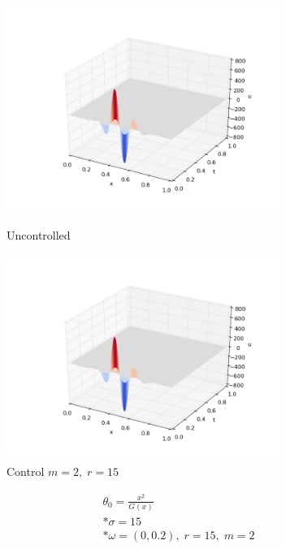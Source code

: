 \documentclass[a4:paper,14pt]{article}
\begin{document}
\begin{figure}[h]
\centering
\begin{minipage}{.5\textwidth}
  \centering
  \includegraphics[width=3.5in]{ex_sin10_s15}
  \caption{Uncontrolled}
  \label{fig:test1}
\end{minipage}%
\begin{minipage}{.5\textwidth}
  \centering
  \includegraphics[width=3.5in]{re_sin10_s15}
  \caption{Control $m = 2, \; r = 15$}
  \label{fig:test2}
\end{minipage}
\end{figure}

\begin{gather}
    \theta_0 = \frac{x^2}{G(x)} \\*
    \sigma = 15 \\*
    \omega = (0, 0.2), \; r = 15, \; m = 2
\end{gather}
\end{document}
